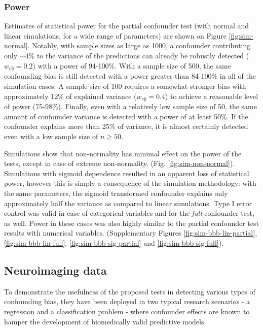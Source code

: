 \documentclass{article}
\begin{document}
\subsubsection*{Power}

Estimates of statistical power for the partial confounder test (with normal and linear simulations, for  a wide range of parameters) are shown on Figure \ref{fig:sim-normal}. Notably, with sample sizes as large as 1000, a confounder contributing only $\sim 4\%$ to the variance of the predictions can already be robustly detected ($w_{c\hat{y}} = 0.2$) with a power of 94-100\%. With a sample size of 500, the same confounding bias is still detected with a power greater than 84-100\% in all of the simulation cases. A sample size of 100 requires a somewhat stronger bias with approximately 12\% of explained variance ($w_{c\hat{y}}=0.4$) to achieve a reasonable level of power (75-98\%). Finally, even with a relatively low sample size of 50, the same amount of confounder variance is detected with a power of at least 50\%. If the confounder explains more than 25\% of variance, it is almost certainly detected even with a low sample size of $n \geq 50$.

Simulations show that non-normality has minimal effect on the power of the tests, except in case of extreme non-normality. (Fig. \ref{fig:sim-non-normal}). Simulations with sigmoid dependence resulted in an apparent loss of statistical power, however this is simply a consequence of the simulation methodology: with the same parameters, the sigmoid transformed confounder explains only approximately half the variance as compared to linear simulations.
Type I error control was valid in case of categorical variables and for the \emph{full} confounder test, as well. Power in these cases was also highly similar to the partial confounder test results with numerical variables. (Supplementary Figures \ref{fig:sim-bbb-lin-partial}, \ref{fig:sim-bbb-lin-full}, \ref{fig:sim-bbb-sig-partial} and \ref{fig:sim-bbb-sig-full}).


\subsection{Neuroimaging data}

To demonstrate the usefulness of the proposed tests in detecting various types of confounding bias, they have been deployed in two typical research scenarios - a regression and a classification problem - where confounder effects are known to hamper the development of biomedically valid predictive models. 
\end{document}
